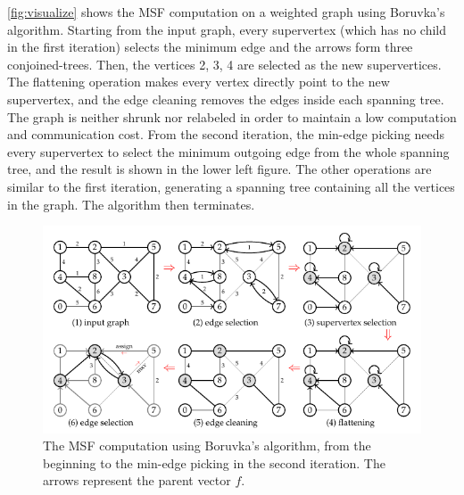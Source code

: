 \documentclass{sokendai_thesis} %
\newcommand{\boruvka}[0]{Boruvka}
\begin{document}
\autoref{fig:visualize} shows the MSF computation on a weighted graph using \boruvka{}'s algorithm.
Starting from the input graph, every supervertex (which has no child in the first iteration) selects the minimum edge and the arrows form three conjoined-trees.
Then, the vertices 2, 3, 4 are selected as the new supervertices.
The flattening operation makes every vertex directly point to the new supervertex, and the edge cleaning removes the edges inside each spanning tree.
The graph is neither shrunk nor relabeled in order to maintain a low computation and communication cost.
From the second iteration, the min-edge picking needs every supervertex to select the minimum outgoing edge from the whole spanning tree, and the result is shown in the lower left figure.
The other operations are similar to the first iteration, generating a spanning tree containing all the vertices in the graph.
The algorithm then terminates.

\begin{figure}
\centering
\includegraphics[width=\textwidth]{figures/algo.pdf}
\caption{The MSF computation using \boruvka{}'s algorithm, from the beginning to the min-edge picking in the second iteration. The arrows represent the parent vector $f$.}
\vspace{-8pt}
\label{fig:visualize}
\end{figure}
\end{document}

